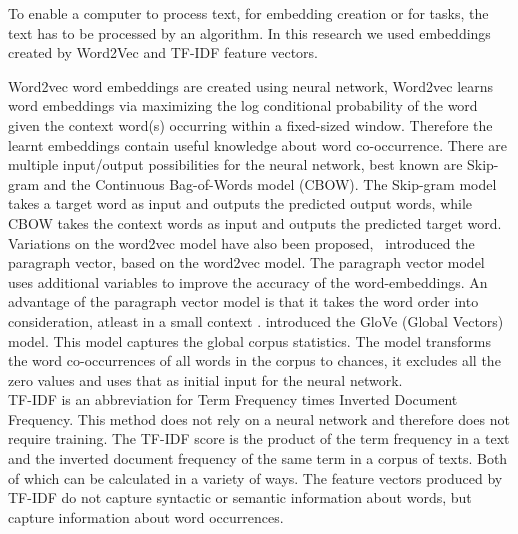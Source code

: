 \documentclass[../../Thesis.tex]{subfiles}
\begin{document}
To enable a computer to process text, for embedding creation or for tasks, the text has to be processed by an algorithm. In this research we used embeddings created by Word2Vec and TF-IDF feature vectors.
\begin{jumpin}
Word2vec word embeddings are created using neural network, Word2vec learns word embeddings via maximizing the log conditional probability of the word given the context word(s) occurring within a fixed-sized window. Therefore the learnt embeddings contain useful knowledge about word co-occurrence\cite{nalisnick2016improving}. There are multiple input/output possibilities for the neural network, best known are Skip-gram and the Continuous Bag-of-Words model (CBOW). The Skip-gram model takes a target word as input and outputs the predicted output words, while CBOW takes the context words as input and outputs the predicted target word\cite{nalisnick2016improving, pennington2014glove}.
Variations on the word2vec model have also been proposed,~\citet{le2014distributed} introduced the paragraph vector, based on the word2vec model. The paragraph vector model uses additional variables to improve the accuracy of the word-embeddings. An advantage of the paragraph vector model is that it takes the word order into consideration, atleast in a small context \cite{le2014distributed}.
\citet{pennington2014glove} introduced the GloVe (Global Vectors) model. This model captures the global corpus statistics. The model transforms the word co-occurrences of all words in the corpus to chances, it excludes all the zero values and uses that as initial input for the neural network.\\
TF-IDF is an abbreviation for Term Frequency times Inverted Document Frequency. This method does not rely on a neural network and therefore does not require training. The TF-IDF score is the product of the term frequency in a text and the inverted document frequency of the same term in a corpus of texts. Both of which can be calculated in a variety of ways. The feature vectors produced by TF-IDF do not capture syntactic or semantic information about words, but capture information about word occurrences.
\end{jumpin}
\end{document}
